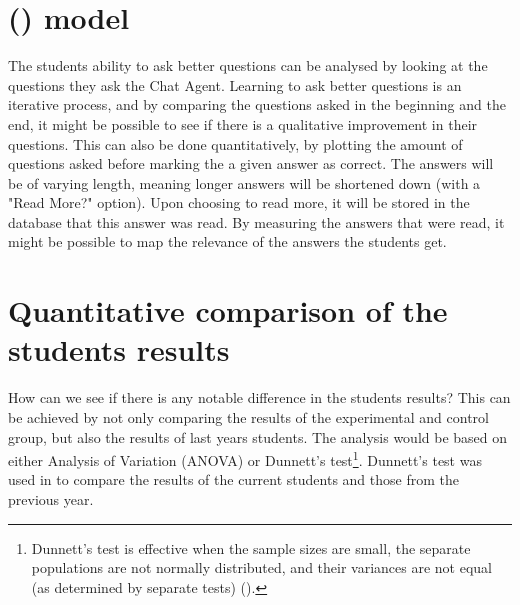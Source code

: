 \section{ () model}
\label{chapter4:qa_model}
The students ability to ask better questions can be analysed by looking at the questions they ask the Chat Agent. Learning to ask better questions is an iterative 
process, and by comparing the questions asked in the beginning and the end, it might be possible to see if there is a qualitative improvement in their questions.
This can also be done quantitatively, by plotting the amount of questions asked before marking the a given answer as correct. 
\vspace{0.5em}\newline
The answers will be of varying length, meaning longer answers will be shortened down (with a "Read More?" option). Upon choosing to read more, 
it will be stored in the database that this answer was read. By measuring the answers that were read, it might be possible to map the relevance of the answers 
the students get.


\section{Quantitative comparison of the students results}
\label{chapter4:quantitative_comparison}
How can we see if there is any notable difference in the students results? This can be achieved by not only comparing the results of the experimental and control group, but 
also the results of last years students. The analysis would be based on either Analysis of Variation (ANOVA) or Dunnett's test\footnote{Dunnett's test is effective 
	when the sample sizes are small, the separate populations are not normally distributed, and their variances are not equal (as determined by separate tests) 
	(\citet[p.~3]{Simon2011}).}. Dunnett's test was used in \citet{Simon2011} to compare the results of the current students and those from the previous year.

